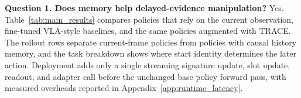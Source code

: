 \documentclass{article}
\begin{document}


\textbf{Question 1. Does memory help delayed-evidence manipulation?}
Yes. Table~\ref{tab:main_results} compares policies that rely on the current observation, fine-tuned VLA-style baselines, and the same policies augmented with TRACE. The rollout rows separate current-frame policies from policies with causal history memory, and the task breakdown shows where start identity determines the later action. Deployment adds only a single streaming signature update, slot update, readout, and adapter call before the unchanged base policy forward pass, with measured overheads reported in Appendix~\ref{app:runtime_latency}.
\end{document}
